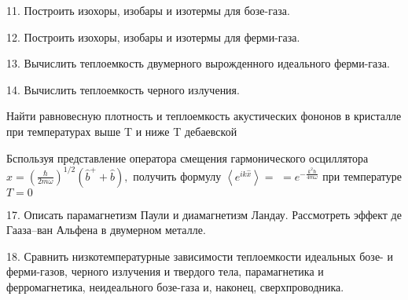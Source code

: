 \documentclass[a4paper,12pt]{article} %
\begin{document}
\begin{task}

11. Построить изохоры, изобары и изотермы для бозе-газа. 



\end{task}


\begin{task}

12. Построить изохоры, изобары и изотермы для ферми-газа. 


\end{task}


\begin{task}

13. Вычислить теплоемкость двумерного вырожденного идеального ферми-газа. 


\end{task}


\begin{task}

14. Вычислить теплоемкость черного излучения. 


\end{task}


\begin{task}

Найти равновесную плотность и теплоемкость акустических фононов в кристалле при температурах выше T  и ниже T  дебаевской


\end{task}


\begin{task}

Бспользуя представление оператора смещения гармонического осциллятора $\hat{x}=\left(\frac{\hbar}{2 m \omega}\right)^{1 / 2}\left(\hat{b}^{+}+\hat{b}\right),$ получить формулу $\left\langle e^{i k \hat{x}}\right\rangle=$
$=e^{-\frac{k^{2} \hbar}{4 m \omega}}$ при температуре $T=0$

\end{task}




\begin{task}
17. Описать парамагнетизм Паули и диамагнетизм Ландау. Рассмотреть эффект де Гааза–ван Альфена в двумерном металле. 

\end{task}


\begin{task}

18. Сравнить низкотемпературные зависимости теплоемкости идеальных бозе- и ферми-газов, черного излучения и твердого тела, парамагнетика и ферромагнетика, неидеального бозе-газа и, наконец, сверхпроводника. 


\end{task}
\end{document}
